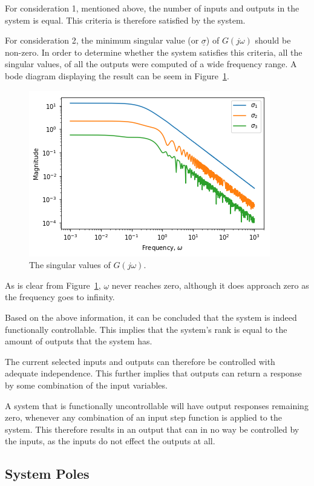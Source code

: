 For consideration 1, mentioned above, the number of inputs and outputs in the system is equal. This criteria is therefore satisfied by the system.

For consideration 2, the minimum singular value (or $\underline{\sigma}$) of $G(j\omega)$ should be non-zero. In order to determine whether the system satisfies this criteria, all the singular values, of all the outputs were computed of a wide frequency range. A bode diagram displaying the result can be seem in Figure~\ref{fig:gs-singular-values}.

\begin{figure}
	\centering
	\includegraphics[width=0.7\linewidth]{"Figures/G(s) Singular Values"}
	\caption{The singular values of $G(j\omega)$.}
	\label{fig:gs-singular-values}
\end{figure}

As is clear from Figure~\ref{fig:gs-singular-values}, $\underline{\omega}$ never reaches zero, although it does approach zero as the frequency goes to infinity. 

Based on the above information, it can be concluded that the system is indeed functionally controllable. This implies that the system's rank is equal to the amount of outputs that the system has.

The current selected inputs and outputs can therefore be controlled with adequate independence. This further implies that outputs can return a response by some combination of the input variables.

A system that is functionally uncontrollable will have output responses remaining zero, whenever any combination of an input step function is applied to the system. This therefore results in an output that can in no way be controlled by the inputs, as the inputs do not effect the outputs at all.

\subsection{System Poles}
\label{sec:System Poles}
